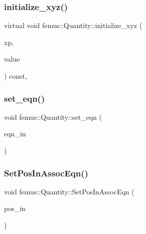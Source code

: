 \mbox{\label{classfemus_1_1_quantity_adac02deb7a140ad0a28d2aaa793e7022}} 
\subsubsection{\texorpdfstring{initialize\+\_\+xyz()}{initialize\_xyz()}}
{\footnotesize\ttfamily virtual void femus\+::\+Quantity\+::initialize\+\_\+xyz (\begin{DoxyParamCaption}\item[{const double $\ast$}]{xp,  }\item[{std\+::vector$<$ double $>$ \&}]{value }\end{DoxyParamCaption}) const\hspace{0.3cm}{\ttfamily [inline]}, {\ttfamily [virtual]}}

\mbox{\label{classfemus_1_1_quantity_a717be1d370eb986eaaebc7bc86bf3a1b}} 
\subsubsection{\texorpdfstring{set\+\_\+eqn()}{set\_eqn()}}
{\footnotesize\ttfamily void femus\+::\+Quantity\+::set\+\_\+eqn (\begin{DoxyParamCaption}\item[{\mbox{\hyperlink{classfemus_1_1_system_two}{System\+Two}} $\ast$}]{eqn\+\_\+in }\end{DoxyParamCaption})}

\mbox{\label{classfemus_1_1_quantity_a78ac2de59d0f1216962caea2a82801b4}} 
\subsubsection{\texorpdfstring{Set\+Pos\+In\+Assoc\+Eqn()}{SetPosInAssocEqn()}}
{\footnotesize\ttfamily void femus\+::\+Quantity\+::\+Set\+Pos\+In\+Assoc\+Eqn (\begin{DoxyParamCaption}\item[{\mbox{\hyperlink{_typedefs_8hpp_a91ad9478d81a7aaf2593e8d9c3d06a14}{uint}}}]{pos\+\_\+in }\end{DoxyParamCaption})\hspace{0.3cm}{\ttfamily [inline]}}



